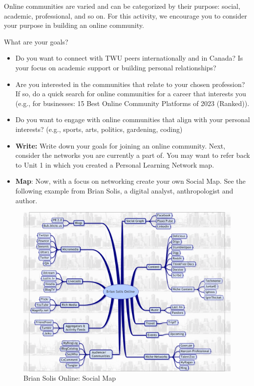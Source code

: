 \documentclass[
  letterpaper,
  DIV=11,
  numbers=noendperiod]{scrreprt}
\providecommand{\tightlist}{%
  \setlength{\itemsep}{0pt}\setlength{\parskip}{0pt}}\usepackage{longtable,booktabs,array}
\begin{document}
\begin{tcolorbox}[enhanced jigsaw, toprule=.15mm, colback=white, colframe=quarto-callout-note-color-frame, bottomtitle=1mm, leftrule=.75mm, coltitle=black, titlerule=0mm, rightrule=.15mm, colbacktitle=quarto-callout-note-color!10!white, left=2mm, title={Learning Activity}, opacitybacktitle=0.6, opacityback=0, breakable, toptitle=1mm, arc=.35mm, bottomrule=.15mm]

Online communities are varied and can be categorized by their purpose:
social, academic, professional, and so on. For this activity, we
encourage you to consider your purpose in building an online community.

What are your goals?

\begin{itemize}
\tightlist
\item
  Do you want to connect with TWU peers internationally and in Canada?
  Is your focus on academic support or building personal relationships?
\item
  Are you interested in the communities that relate to your chosen
  profession? If so, do a quick search for online communities for a
  career that interests you (e.g., for businesses: 15 Best Online
  Community Platforms of 2023 (Ranked)).
\item
  Do you want to engage with online communities that align with your
  personal interests? (e.g., sports, arts, politics, gardening, coding)
\item
  \textbf{Write:} Write down your goals for joining an online community.
  Next, consider the networks you are currently a part of. You may want
  to refer back to Unit 1 in which you created a Personal Learning
  Network map.
\item
  \textbf{Map}: Now, with a focus on networking create your own Social
  Map. See the following example from Brian Solis, a digital analyst,
  anthropologist and author.
\end{itemize}

\begin{figure}[H]

\caption{\label{fig-2374839848x2769ef5f1a}Brian Solis Online: Social Map
}

\includegraphics{assets/u5/social_map.png}


\end{figure}
\end{tcolorbox}
\end{document}
